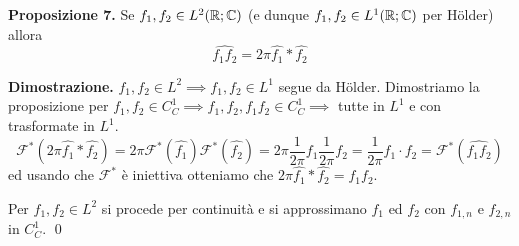 \textbf{Proposizione 7.}
Se $f_1, f_2 \in L^2(\mathbb R; \mathbb C)$ (e dunque $f_1, f_2 \in L^1(\mathbb R; \mathbb C)$ per H\"older) allora
$$
\hat{f_1 f_2} = 2\pi \hat{f_1} \ast \hat{f_2}
$$

\textbf{Dimostrazione.}
$f_1, f_2 \in L^2 \implies f_1, f_2 \in L^1$ segue da H\"older. Dimostriamo la proposizione per $f_1, f_2 \in C_C^1 \implies f_1, f_2, f_1 f_2 \in C_C^1 \implies$ tutte in $L^1$ e con trasformate in $L^1$.
$$
\mathcal F^*(2\pi \hat{f_1} \ast \hat{f_2})
= 2\pi \mathcal F^*(\hat{f_1}) \mathcal F^*(\hat{f_2})
= 2\pi \frac{1}{2\pi} f_1 \frac{1}{2\pi} f_2
= \frac{1}{2\pi} f_1 \cdot f_2 = \mathcal F^*(\hat{f_1 f_2})
$$
ed usando che $\mathcal F^*$ è iniettiva otteniamo che $2\pi \hat{f_1} \ast \hat{f_2} = \hat{f_1 f_2}$. 

Per $f_1, f_2 \in L^2$ si procede per continuità e si approssimano $f_1$ ed $f_2$ con $f_{1,n}$ e $f_{2,n}$ in $C_C^1$.
\qed
